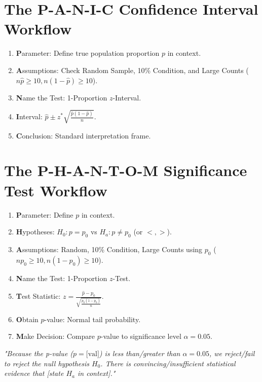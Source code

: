 \documentclass[11pt,oneside,openany]{book}
\begin{document}
\section{The P-A-N-I-C Confidence Interval Workflow}
\begin{enumerate}[leftmargin=1.5em]
  \item \textbf{P}arameter: Define true population proportion $p$ in context.
  \item \textbf{A}ssumptions: Check Random Sample, 10\% Condition, and Large Counts ($n\hat{p} \ge 10, n(1-\hat{p}) \ge 10$).
  \item \textbf{N}ame the Test: 1-Proportion $z$-Interval.
  \item \textbf{I}nterval: $\hat{p} \pm z^* \sqrt{\frac{\hat{p}(1-\hat{p})}{n}}$.
  \item \textbf{C}onclusion: Standard interpretation frame.
\end{enumerate}

\section{The P-H-A-N-T-O-M Significance Test Workflow}
\begin{enumerate}[leftmargin=1.5em]
  \item \textbf{P}arameter: Define $p$ in context.
  \item \textbf{H}ypotheses: $H_0: p = p_0$ vs $H_a: p \ne p_0$ (or $<, >$).
  \item \textbf{A}ssumptions: Random, 10\% Condition, Large Counts using $p_0$ ($np_0 \ge 10, n(1-p_0) \ge 10$).
  \item \textbf{N}ame the Test: 1-Proportion $z$-Test.
  \item \textbf{T}est Statistic: $z = \frac{\hat{p} - p_0}{\sqrt{\frac{p_0(1-p_0)}{n}}}$.
  \item \textbf{O}btain $p$-value: Normal tail probability.
  \item \textbf{M}ake Decision: Compare $p$-value to significance level $\alpha = 0.05$.
\end{enumerate}

\begin{frqrubricbox}
\textit{"Because the p-value ($p = \text{[val]}$) is less than/greater than $\alpha = 0.05$, we reject/fail to reject the null hypothesis $H_0$. There is convincing/insufficient statistical evidence that [state $H_a$ in context]."}
\end{frqrubricbox}
\end{document}

